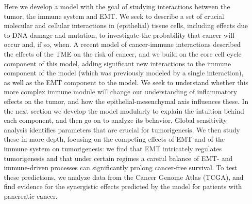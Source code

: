 \documentclass[11pt]{article}
\begin{document}
Here we develop a model with the goal of studying interactions between the tumor, the immune system and EMT. We seek to describe a set of crucial molecular and cellular interactions in (epithelial) tissue cells, including effects due to DNA damage and mutation, to investigate the probability that cancer will occur and, if so, when. A recent model of cancer-immune interactions \cite{guo2017multiscale} described the effects of the TME on the risk of cancer, and we build on the core cell cycle component of this model, adding significant new interactions to the immune component of the model (which was previously modeled by a single interaction), as well as the EMT component to the model. We seek to understand whether this more complex immune module will change our understanding of inflammatory effects on the tumor, and how the epithelial-mesenchymal axis influences these. In the next section we develop the model modularly to explain the intuition behind each component, and then go on to analyze its behavior. Global sensitivity analysis identifies parameters that are crucial for tumorigenesis. We then study these in more depth, focusing on the competing effects of EMT and of the immune system on tumorigenesis: we find that EMT intricately regulates tumorigenesis and that under certain regimes a careful balance of EMT- and immune-driven processes can significantly prolong cancer-free survival. To test these predictions, we analyze data from the Cancer Genome Atlas (TCGA), and find evidence for the synergistic effects predicted by the model for patients with pancreatic cancer. 





%
\end{document}
